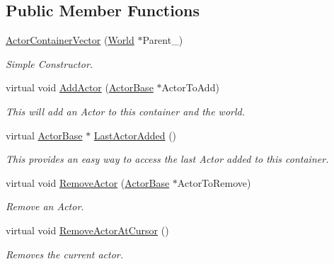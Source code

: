 \subsection*{Public Member Functions}
\begin{DoxyCompactItemize}
\item 
\hyperlink{classphys_1_1ActorContainerVector_a65a17a06bc964c2b5f04a8dbb003622a}{ActorContainerVector} (\hyperlink{classphys_1_1World}{World} $\ast$Parent\_\-)
\begin{DoxyCompactList}\small\item\em Simple Constructor. \item\end{DoxyCompactList}\item 
virtual void \hyperlink{classphys_1_1ActorContainerVector_a4bc3e38f16caddee021a97739bebaf6e}{AddActor} (\hyperlink{classphys_1_1ActorBase}{ActorBase} $\ast$ActorToAdd)
\begin{DoxyCompactList}\small\item\em This will add an Actor to this container and the world. \item\end{DoxyCompactList}\item 
virtual \hyperlink{classphys_1_1ActorBase}{ActorBase} $\ast$ \hyperlink{classphys_1_1ActorContainerVector_a49e643bdeff78521de9c4a9fea59a0d2}{LastActorAdded} ()
\begin{DoxyCompactList}\small\item\em This provides an easy way to access the last Actor added to this container. \item\end{DoxyCompactList}\item 
virtual void \hyperlink{classphys_1_1ActorContainerVector_aeee5bd81601faed85e6a35f576c8d476}{RemoveActor} (\hyperlink{classphys_1_1ActorBase}{ActorBase} $\ast$ActorToRemove)
\begin{DoxyCompactList}\small\item\em Remove an Actor. \item\end{DoxyCompactList}\item 
virtual void \hyperlink{classphys_1_1ActorContainerVector_a430977daf010a25f53df6cf37954f8ca}{RemoveActorAtCursor} ()
\begin{DoxyCompactList}\small\item\em Removes the current actor. \item\end{DoxyCompactList}\item 

\end{DoxyCompactItemize}
